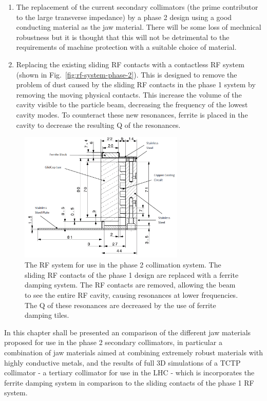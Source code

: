 \begin{enumerate}
\item{The replacement of the current secondary collimators (the prime contributor to the large transverse impedance) by a phase 2 design using a good conducting material as the jaw material. There will be some loss of mechnical robustness but it is thought that this will not be detrimental to the requirements of machine protection with a suitable choice of material.}
\item{Replacing the existing sliding RF contacts with a contactless RF system (shown in Fig.~\ref{fig:rf-system-phase-2}). This is designed to remove the problem of dust caused by the sliding RF contacts in the phase 1 system by removing the moving physical contacts. This increase the volume of the cavity visible to the particle beam, decreasing the frequency of the lowest cavity modes. To counteract these new resonances, ferrite is placed in the cavity to decrease the resulting Q of the resonances.}
\end{enumerate}

\begin{figure}
\begin{center}
\includegraphics[width=0.7\textwidth]{LHC_Collimation_Upgrades/figures/cu-geo.png}
\end{center}
\label{fig:phase-2-rf-system}
\caption{The RF system for use in the phase 2 collimation system. The sliding RF contacts of the phase 1 design are replaced with a ferrite damping system. The RF contacts are removed, allowing the beam to see the entire RF cavity, causing resonances at lower frequencies. The Q of these resonances are decreased by the use of ferrite damping tiles.}
\end{figure}

In this chapter shall be presented an comparison of the different jaw materials proposed for use in the phase 2 secondary collimators, in particular a combination of jaw materials aimed at combining extremely robust materials with highly conductive metals, and the results of full 3D simulations of a TCTP collimator - a tertiary collimator for use in the LHC - which is incorporates the ferrite damping system in comparison to the sliding contacts of the phase 1 RF system. 



